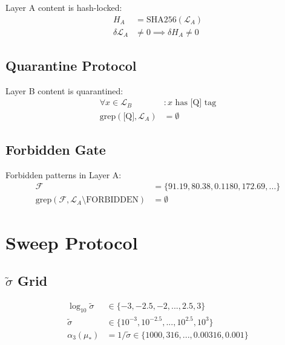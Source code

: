 \documentclass[11pt,a4paper]{article}
\theoremstyle{definition}
\begin{document}
Layer A content is hash-locked:
\begin{align}
\label{eq:fw-4}
H_A &= \text{SHA256}(\mathcal{L}_A) \\
\label{eq:fw-5}
\delta\mathcal{L}_A &\neq 0 \implies \delta H_A \neq 0
\end{align}

\subsection{Quarantine Protocol}
\label{subsec:fw-quarantine}

Layer B content is quarantined:
\begin{align}
\label{eq:fw-6}
\forall x \in \mathcal{L}_B &: x \text{ has [Q] tag} \\
\label{eq:fw-7}
\text{grep}(\text{[Q]}, \mathcal{L}_A) &= \emptyset
\end{align}

\subsection{Forbidden Gate}
\label{subsec:fw-forbidden}

Forbidden patterns in Layer A:
\begin{align}
\label{eq:fw-8}
\mathcal{F} &= \{91.19, 80.38, 0.1180, 172.69, ...\} \\
\label{eq:fw-9}
\text{grep}(\mathcal{F}, \mathcal{L}_A \setminus \text{FORBIDDEN}) &= \emptyset
\end{align}

\section{Sweep Protocol}
\label{app:sweep}

\subsection{$\tilde{\sigma}$ Grid}
\label{subsec:sweep-grid}

\begin{align}
\label{eq:sweep-1}
\log_{10}\tilde{\sigma} &\in \{-3, -2.5, -2, ..., 2.5, 3\} \\
\label{eq:sweep-2}
\tilde{\sigma} &\in \{10^{-3}, 10^{-2.5}, ..., 10^{2.5}, 10^3\} \\
\label{eq:sweep-3}
\alpha_3(\mu_*) &= 1/\tilde{\sigma} \in \{1000, 316, ..., 0.00316, 0.001\}
\end{align}
\end{document}
